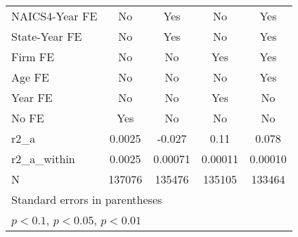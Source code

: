 {\begin{tabular}{l*{4}{c}}
\addlinespace
NAICS4-Year FE      &          No         &         Yes         &          No         &         Yes         \\
\addlinespace
State-Year FE       &          No         &         Yes         &          No         &         Yes         \\
\addlinespace
Firm FE             &          No         &          No         &         Yes         &         Yes         \\
\addlinespace
Age FE              &          No         &          No         &          No         &         Yes         \\
\addlinespace
Year FE             &          No         &          No         &         Yes         &          No         \\
\addlinespace
No FE               &         Yes         &          No         &          No         &          No         \\
\midrule
r2\_a                &      0.0025         &      -0.027         &        0.11         &       0.078         \\
r2\_a\_within         &      0.0025         &     0.00071         &     0.00011         &     0.00010         \\
N                   &      137076         &      135476         &      135105         &      133464         \\
\bottomrule
\multicolumn{5}{l}{\footnotesize Standard errors in parentheses}\\
\multicolumn{5}{l}{\footnotesize \sym{*} \(p<0.1\), \sym{**} \(p<0.05\), \sym{***} \(p<0.01\)}\\
\end{tabular}
}
